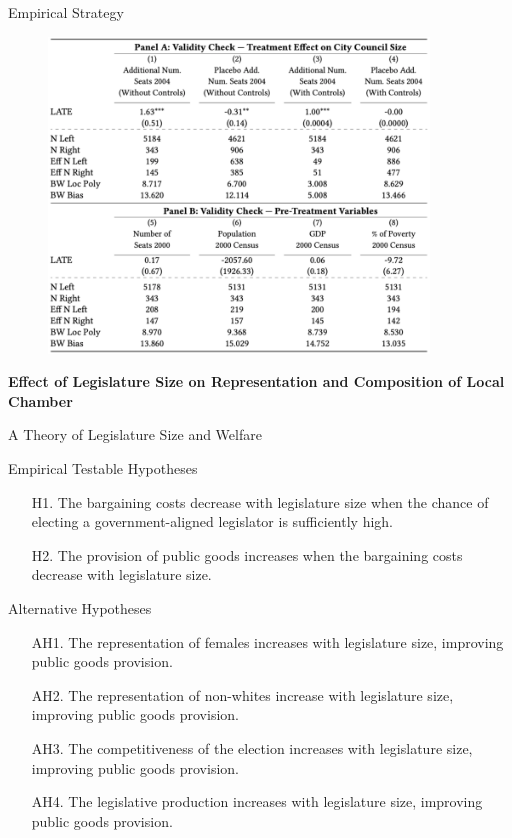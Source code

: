 \documentclass[11pt]{beamer}
\begin{document}
\begin{frame}{Empirical Strategy}
  \begin{figure}[htb]
   \centering
   \includegraphics[width=0.9\textwidth]{fig0.png}
  \end{figure}
\end{frame}

\begin{frame}
\begin{center}
\Large{\textbf{Effect of Legislature Size on Representation and Composition of Local Chamber}}
\end{center}
\end{frame}

\begin{frame}{A Theory of Legislature Size and Welfare}
\begin{block}{Empirical Testable Hypotheses}
\begin{enumerate}
  \item[H1.] The bargaining costs decrease with legislature size when the chance of electing a government-aligned legislator is sufficiently high.
  \item[H2.] The provision of public goods increases when the bargaining costs decrease with legislature size.
\end{enumerate}
\end{block}
\pause
\begin{block}{Alternative Hypotheses}
\begin{enumerate}
  \item[AH1.] The representation of females increases with legislature size, improving public goods provision.
  \item[AH2.] The representation of non-whites increase with legislature size, improving public goods provision.
  \item[AH3.] The competitiveness of the election increases with legislature size, improving public goods provision.
  \item[AH4.] The legislative production increases with legislature size, improving public goods provision.
\end{enumerate}
\end{block}
\end{frame}
\end{document}
